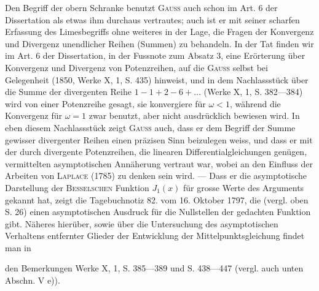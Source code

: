 Den Begriff der obern Schranke benutzt \textsc{Gauss} auch schon im Art. 6
der Dissertation als etwas ihm durchaus vertrautes; auch ist er mit seiner
scharfen Erfassung des Limesbegriffs ohne weiteres in der Lage, die Fragen
der Konvergenz und Divergenz unendlicher Reihen (Summen) zu behandeln.
In der Tat finden wir im Art. 6 der Dissertation, in der Fussnote zum Absatz 3,
eine Erörterung über Konvergenz und Divergenz von Potenzreihen,
auf die \textsc{Gauss} selbst bei Gelegenheit (1850, Werke X, 1, S. 435) hinweist,
und in dem Nachlassstück über die Summe der divergenten Reihe \(1-1+
2-6+\ldots\) (Werke X, 1, S. 382—384) wird von einer Potenzreihe gesagt, sie
konvergiere für \(\omega<1\), während die Konvergenz für \(\omega=1\) zwar benutzt, aber
nicht ausdrücklich bewiesen wird. In eben diesem Nachlassstück zeigt \textsc{Gauss}
auch, dass er dem Begriff der Summe gewisser divergenter Reihen einen präzisen
Sinn beizulegen weiss, und dass er mit der durch divergente Potenzreihen,
die linearen Differentialgleichungen genügen, vermittelten asymptotischen
Annäherung vertraut war, wobei an den Einfluss der Arbeiten von \textsc{Laplace}
(1785) zu denken sein wird. — Dass er die asymptotische Darstellung der
\textsc{Besselschen} Funktion \(J_1(x)\) für grosse Werte des Arguments gekannt hat, zeigt
die Tagebuchnotiz 82. vom 16. Oktober 1797, die (vergl. oben S. 26) einen
asymptotischen Ausdruck für die Nullstellen der gedachten Funktion gibt.
Näheres hierüber, sowie über die Untersuchung des asymptotischen Verhaltens
entfernter Glieder der Entwicklung der Mittelpunktsgleichung findet man in\par
\clearpage{}
\noindent den Bemerkungen Werke X, 1, S. 385—389 und S. 438—447 (vergl. auch unten
Abschn. V e)).
